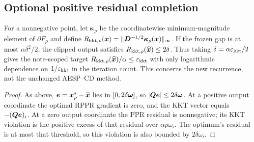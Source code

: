 \subsection{Optional positive residual completion}
\begin{corollary}
\label{cor:revisit-kkt}
For a nonnegative point, let $\bm{\kappa}_\rho$ be the coordinatewise
minimum-magnitude element of $\partial F_\rho$ and define
$R_{\mathrm{kkt},\rho}(\bm{x})
=\|\bm{D}^{-1/2}\bm{\kappa}_\rho(\bm{x})\|_\infty$.
If the frozen gap is at most $\alpha\delta^2/2$, the clipped output
satisfies $R_{\mathrm{kkt},\rho}(\widehat{\bm{x}})\leq2\delta$.
Thus taking $\delta=\alpha\varepsilon_{\mathrm{kkt}}/2$ gives the note-scoped target
$R_{\mathrm{kkt},\rho}(\widehat{\bm{x}})/\alpha\leq\varepsilon_{\mathrm{kkt}}$
with only logarithmic dependence on $1/\varepsilon_{\mathrm{kkt}}$ in the iteration count.
This concerns the new recurrence, not the unchanged AESP--CD method.
\end{corollary}
\begin{proof}
As above, $\bm{e}=\bm{x}_\rho^*-\widehat{\bm{x}}$ lies in
$[0,2\delta\bm{\omega}]$, so $|\bm{Q}\bm{e}|\leq2\delta\bm{\omega}$.
At a positive output coordinate the optimal RPPR gradient is zero, and
the KKT vector equals $-(\bm{Q}\bm{e})_i$.
At a zero output coordinate the PPR residual is nonnegative; its KKT
violation is the positive excess of that residual over
$\alpha\rho\omega_i$. The optimum's residual is at most that threshold,
so this violation is also bounded by $2\delta\omega_i$.
\end{proof}

